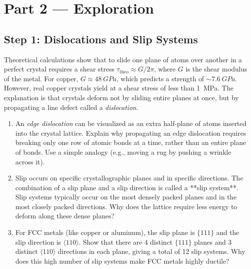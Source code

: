 \documentclass[12pt, a4paper]{book}
\newcommand{\newterm}[1]{\textit{\textcolor{DiscoveryColor}{#1}}}
\begin{document}
\newpage

\section{Part 2 --- Exploration}

\subsection{Step 1: Dislocations and Slip Systems}

\begin{problembox}
Theoretical calculations show that to slide one plane of atoms over another in a perfect crystal requires a shear stress $\tau_{\text{theo}} \approx G / 2\pi$, where $G$ is the shear modulus of the metal. For copper, $G \approx \SI{48}{GPa}$, which predicts a strength of $\sim \SI{7.6}{GPa}$. However, real copper crystals yield at a shear stress of less than \SI{1}{MPa}.
The explanation is that crystals deform not by sliding entire planes at once, but by propagating a line defect called a \newterm{dislocation}.

\begin{enumerate}[label=(\alph*)]
  \item An \newterm{edge dislocation} can be visualized as an extra half-plane of atoms inserted into the crystal lattice. Explain why propagating an edge dislocation requires breaking only one row of atomic bonds at a time, rather than an entire plane of bonds. Use a simple analogy (e.g., moving a rug by pushing a wrinkle across it).
  \item Slip occurs on specific crystallographic planes and in specific directions. The combination of a slip plane and a slip direction is called a **slip system**. Slip systems typically occur on the most densely packed planes and in the most closely packed directions. Why does the lattice require less energy to deform along these dense planes?
  \item For FCC metals (like copper or aluminum), the slip plane is $\{111\}$ and the slip direction is $\langle 110\rangle$. Show that there are 4 distinct $\{111\}$ planes and 3 distinct $\langle 110\rangle$ directions in each plane, giving a total of 12 slip systems. Why does this high number of slip systems make FCC metals highly ductile?
\end{enumerate}
\end{problembox}
\end{document}
